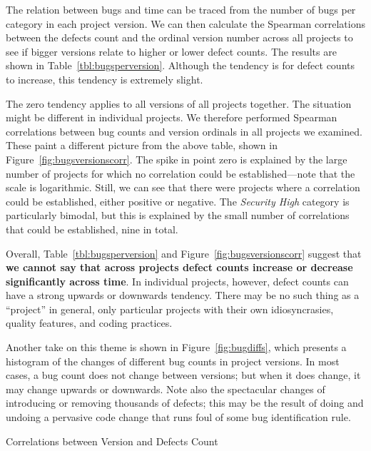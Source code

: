 \documentclass{sig-alternate}
\begin{document}
The relation between bugs and time can be traced from the number of
bugs per category in each project version. We can then calculate the
Spearman correlations between the defects count and the ordinal
version number across all projects to see if bigger versions relate to
higher or lower defect counts. The results are shown in
Table~\ref{tbl:bugsperversion}. Although the tendency is for defect
counts to increase, this tendency is extremely slight.

The zero tendency applies to all versions of all projects together. 
The situation might be different in individual projects. We therefore
performed Spearman correlations between bug counts and version
ordinals in all projects we examined. These paint a different picture
from the above table, shown in Figure~\ref{fig:bugsversionscorr}. The
spike in point zero is explained by the large number of projects for
which no correlation could be established---note that the scale is
logarithmic. Still, we can see that there were projects where a
correlation could be established, either positive or negative. The
{\it Security High} category is particularly bimodal, but this is
explained by the small number of correlations that could be
established, nine in total.

Overall, Table~\ref{tbl:bugsperversion} and
Figure~\ref{fig:bugsversionscorr} suggest that \textbf{we cannot say that
across projects defect counts increase or decrease significantly
across time}. In individual projects, however, defect counts can have a
strong upwards or downwards tendency. There may be no such thing as a
``project'' in general, only particular projects with their own
idiosyncrasies, quality features, and coding practices.

Another take on this theme is shown in Figure~\ref{fig:bugdiffs},
which presents a histogram of the changes of different bug counts in
project versions. In most cases, a bug count does not change between
versions; but when it does change, it may change upwards or downwards.
Note also the spectacular changes of introducing or removing thousands
of defects; this may be the result of doing and undoing a pervasive
code change that runs foul of some bug identification rule.

\begin{table}[tphp]
    \centering
    \caption{Correlations between Version and Defects Count}
    \label{tbl:bugsperversion}
    
\end{table}
\end{document}
